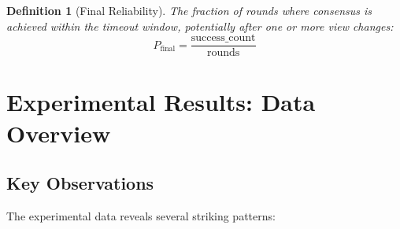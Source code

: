 \documentclass[12pt,a4paper]{article}
\newtheorem{definition}{Definition}
\begin{document}
\begin{definition}[Final Reliability]
The fraction of rounds where consensus is achieved within the timeout window, potentially after one or more view changes:
\[
  P_{\text{final}} = \frac{\text{success\_count}}{\text{rounds}}
\]
\end{definition}

\section{Experimental Results: Data Overview}
\label{sec:results}

\subsection{Key Observations}

The experimental data reveals several striking patterns:
\end{document}
